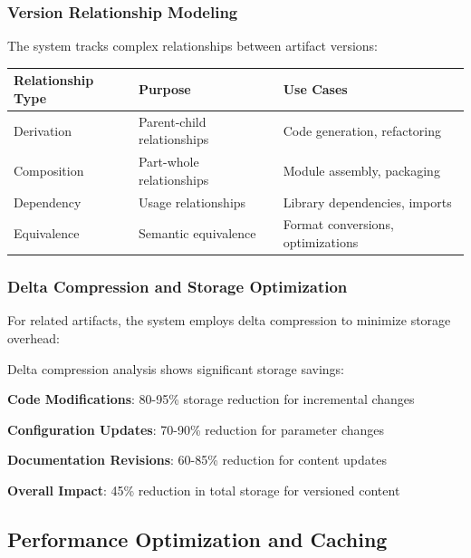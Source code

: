 \subsubsection*{Version Relationship Modeling}

The system tracks complex relationships between artifact versions:

\begin{center}
\begin{tabular}{@{}lll@{}}
\toprule
\textbf{Relationship Type} & \textbf{Purpose} & \textbf{Use Cases} \\
\midrule
Derivation & Parent-child relationships & Code generation, refactoring \\
Composition & Part-whole relationships & Module assembly, packaging \\
Dependency & Usage relationships & Library dependencies, imports \\
Equivalence & Semantic equivalence & Format conversions, optimizations \\
\bottomrule
\end{tabular}
\end{center}

\subsubsection*{Delta Compression and Storage Optimization}

For related artifacts, the system employs delta compression to minimize storage overhead:

\begin{infobox}[title=Delta Compression Benefits]
Delta compression analysis shows significant storage savings:
\begin{compactlist}
    \item \textbf{Code Modifications}: 80-95\% storage reduction for incremental changes
    \item \textbf{Configuration Updates}: 70-90\% reduction for parameter changes
    \item \textbf{Documentation Revisions}: 60-85\% reduction for content updates
    \item \textbf{Overall Impact}: 45\% reduction in total storage for versioned content
\end{compactlist}
\end{infobox}

\subsection*{Performance Optimization and Caching}

